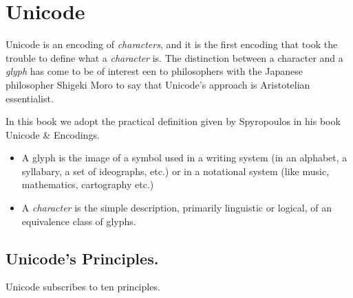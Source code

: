 \chapter{Unicode}

Unicode is an encoding of \textit{characters}, and it is the first encoding that took the trouble to define what a
\textit{character} is. The distinction between a character and a \textit{glyph} has come to be of interest een to philosophers with the Japanese philosopher Shigeki Moro to say that Unicode’s approach is Aristotelian essentialist. 

In this book we adopt the practical definition given by Spyropoulos in his book Unicode \& Encodings. 

\begin{itemize}

\item A glyph is the image of a symbol used in a writing system (in an alphabet, a syllabary, a set of ideographs, etc.) or in a notational system (like music, mathematics, cartography etc.)

\item A \textit{character} is the simple description, primarily linguistic or logical, of an equivalence class of glyphs.
\end{itemize}

\section{Unicode's Principles.}

Unicode subscribes to ten principles.

